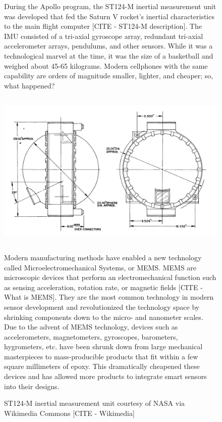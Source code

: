 \begin{figure}
    \begin{fitbox}[frametitle=Aside: MEMS Technology]
        During the Apollo program, the ST124-M inertial measurement unit was developed that fed the Saturn V rocket's inertial characteristics to the main flight computer [CITE - ST124-M description].
        The IMU consisted of a tri-axial gyroscope array, redundant tri-axial accelerometer arrays, pendulums, and other sensors.
        While it was a technological marvel at the time, it was the size of a basketball and weighed about 45-65 kilograms.
        Modern cellphones with the same capability are orders of magnitude smaller, lighter, and cheaper; so, what happened?

        \begin{center}
            \includegraphics[height=3in]{images/background/Apollo_IMU_exhibit.jpg}
            \caption[ST124-M Outline]{ST124-M inertial measurement unit courtesy of NASA via Wikimedia Commons [CITE - Wikimedia]}
        \end{center}

        Modern manufacturing methods have enabled a new technology called Microelectromechanical Systems, or MEMS.
        MEMS are microscopic devices that perform an electromechanical function such as sensing acceleration, rotation rate, or magnetic fields [CITE - What is MEMS].
        They are the most common technology in modern sensor development and revolutionized the technology space by shrinking components down to the micro- and nanometer scales.
        Due to the advent of MEMS technology, devices such as accelerometers, magnetometers, gyroscopes, barometers, hygrometers, etc. have been shrunk down from large mechanical masterpieces to mass-producible products that fit within a few square millimeters of epoxy.
        This dramatically cheapened these devices and has allowed more products to integrate smart sensors into their designs.
    \end{fitbox}
\end{figure}

